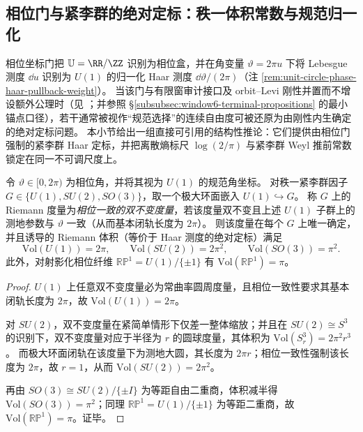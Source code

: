 \subsection{相位门与紧李群的绝对定标：秩一体积常数与规范归一化}\label{subsec:unit-circle-phase-compact-lie-normalization}
相位坐标门把 \(\mathbb{U}=\RR/\ZZ\) 识别为相位盒，并在角变量 \(\vartheta=2\pi u\) 下将 Lebesgue 测度 \(\dd u\) 识别为 \(U(1)\) 的归一化 Haar 测度 \(\dd\vartheta/(2\pi)\)（注 \ref{rem:unit-circle-phase-haar-pullback-weight}）。
当该门与有限窗审计接口及 orbit--Levi 刚性并置而不增设额外公理时（见 \cite{Internal2025ResolutionFoldingPhiPi}；并参照 \S\ref{subsubsec:window6-terminal-propositions} 的最小锚点口径），若干通常被视作“规范选择”的连续自由度可被还原为由刚性内生确定的绝对定标问题。
本小节给出一组直接可引用的结构性推论：它们提供由相位门强制的紧李群 Haar 定标，并把离散熵标尺 \(\log(2/\pi)\) 与紧李群 Weyl 推前常数锁定在同一不可调尺度上。
\par

\begin{proposition}\label{prop:phase-gate-rank1-volume-rigidity}
令 \(\vartheta\in[0,2\pi)\) 为相位角，并将其视为 \(U(1)\) 的规范角坐标。
对秩一紧李群因子 \(G\in\{U(1),SU(2),SO(3)\}\)，取一个极大环面嵌入 \(U(1)\hookrightarrow G\)。
称 \(G\) 上的 Riemann 度量为\emph{相位一致的双不变度量}，若该度量双不变且上述 \(U(1)\) 子群上的测地参数与 \(\vartheta\) 一致（从而基本闭轨长度为 \(2\pi\)）。
则该度量在每个 \(G\) 上唯一确定，并且诱导的 Riemann 体积（等价于 Haar 测度的绝对定标）满足
\[
\mathrm{Vol}(U(1))=2\pi,\qquad
\mathrm{Vol}(SU(2))=2\pi^{2},\qquad
\mathrm{Vol}(SO(3))=\pi^{2}.
\]
此外，对射影化相位纤维 \(\mathbb{RP}^{1}=U(1)/\{\pm 1\}\) 有 \(\mathrm{Vol}(\mathbb{RP}^{1})=\pi\)。
\end{proposition}
\begin{proof}
\(U(1)\) 上任意双不变度量必为常曲率圆周度量，且相位一致性要求其基本闭轨长度为 \(2\pi\)，故 \(\mathrm{Vol}(U(1))=2\pi\)。
\par
对 \(SU(2)\)，双不变度量在紧简单情形下仅差一整体缩放；并且在 \(SU(2)\cong S^{3}\) 的识别下，双不变度量对应于半径为 \(r\) 的圆球度量，其体积为 \(\mathrm{Vol}(S^{3}_{r})=2\pi^{2}r^{3}\)。
而极大环面闭轨在该度量下为测地大圆，其长度为 \(2\pi r\)；相位一致性强制该长度为 \(2\pi\)，故 \(r=1\)，从而 \(\mathrm{Vol}(SU(2))=2\pi^{2}\)。
\par
再由 \(SO(3)\cong SU(2)/\{\pm I\}\) 为等距自由二重商，体积减半得 \(\mathrm{Vol}(SO(3))=\pi^{2}\)；同理 \(\mathbb{RP}^{1}=U(1)/\{\pm 1\}\) 为等距二重商，故 \(\mathrm{Vol}(\mathbb{RP}^{1})=\pi\)。证毕。
\end{proof}

